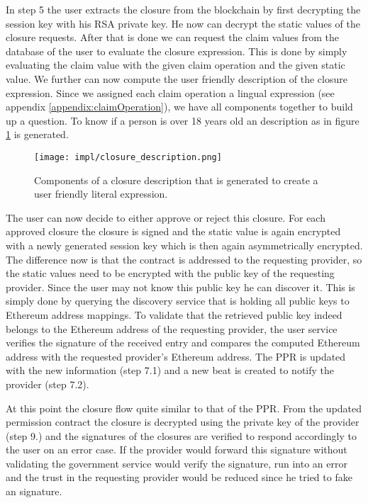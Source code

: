 In step 5 the user extracts the closure from the blockchain by first decrypting the session key with his RSA private key. He now can decrypt the static values of the closure requests. After that is done we can request the claim values from the database of the user to evaluate the closure expression. This is done by simply evaluating the claim value with the given claim operation and the given static value. We further can now compute the user friendly description of the closure expression. Since we assigned each claim operation a lingual expression (see appendix \ref{appendix:claimOperation}), we have all components together to build up a question. To know if a person is over 18 years old an description as in figure \ref{fig:closureDescription} is generated.

\begin{figure}
\texttt{[image: impl/closure\_description.png]}
\centering
\caption{Components of a closure description that is generated to create a user friendly literal expression.}
\label{fig:closureDescription}
\end{figure}

The user can now decide to either approve or reject this closure. For each approved closure the closure is signed and the static value is again encrypted with a newly generated session key which is then again asymmetrically encrypted. The difference now is that the contract is addressed to the requesting provider, so the static values need to be encrypted with the public key of the requesting provider. Since the user may not know this public key he can discover it. This is simply done by querying the discovery service that is holding all public keys to Ethereum address mappings. To validate that the retrieved public key indeed belongs to the Ethereum address of the requesting provider, the user service verifies the signature of the received entry and compares the computed Ethereum address with the requested provider’s Ethereum address. The PPR is updated with the new information (step 7.1) and a new beat is created to notify the provider (step 7.2).

At this point the closure flow quite similar to that of the PPR. From the updated permission contract  the closure is decrypted using the private key of the provider (step 9.) and the signatures of the closures are verified to respond accordingly to the user on an error case. If the provider would forward this signature without validating the government service would verify the signature, run into an error and the trust in the requesting provider would be reduced since he tried to fake an signature. 

